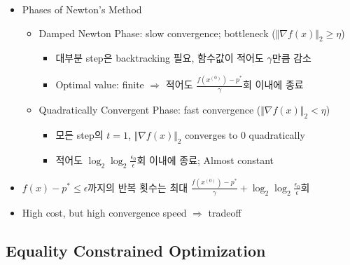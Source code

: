 \begin{itemize}
    \item Phases of Newton's Method
    \begin{itemize}
        \item Damped Newton Phase: slow convergence; bottleneck ($\Vert\nabla f(x)\Vert_2\geq\eta$)
        \begin{itemize}
            \item 대부분 step은 backtracking 필요, 함수값이 적어도 $\gamma$만큼 감소
            \item Optimal value: finite $\Rightarrow$ 적어도 $\frac{f(x^{(0)})-p^\ast}{\gamma}$회 이내에 종료
        \end{itemize}
        \item Quadratically Convergent Phase: fast convergence ($\Vert\nabla f(x)\Vert_2<\eta$)
        \begin{itemize}
            \item 모든 step의 $t=1$, $\Vert\nabla f(x)\Vert_2$ converges to 0 quadratically
            \item 적어도 $\log_2\log_2\frac{\epsilon_0}{\epsilon}$회 이내에 종료; Almost constant
        \end{itemize}
    \end{itemize}
    \item $f(x)-p^\ast\leq\epsilon$까지의 반복 횟수는 최대 $\frac{f(x^{(0)})-p^\ast}{\gamma}+\log_2\log_2\frac{\epsilon_0}{\epsilon}$회
    \item High cost, but high convergence speed $\Rightarrow$ tradeoff
\end{itemize}

\subsection{Equality Constrained Optimization}

